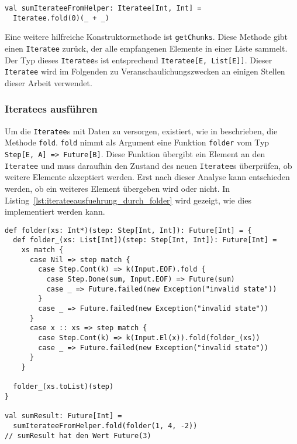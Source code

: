 \begin{lstlisting}[caption=Erstellung eines Iteratees durch Konstruktormethode im Companion-Objekt, label=lst:iteratee_durch_hilfsmethode]
val sumIterateeFromHelper: Iteratee[Int, Int] =
  Iteratee.fold(0)(_ + _)
\end{lstlisting}

Eine weitere hilfreiche Konstruktormethode ist \lstinline|getChunks|.
Diese Methode gibt einen \lstinline|Iteratee| zurück, der alle empfangenen Elemente in einer Liste sammelt.
Der Typ dieses \lstinline|Iteratee|s ist entsprechend \lstinline|Iteratee[E, List[E]]|.
Dieser \lstinline|Iteratee| wird im Folgenden zu Veranschaulichungszwecken an einigen Stellen dieser Arbeit verwendet.



\subsubsection{Iteratees ausführen} %
\label{ssub:iteratees_ausfuehren}

Um die \lstinline|Iteratee|s mit Daten zu versorgen, existiert, wie in  beschrieben, die Methode \lstinline|fold|.
\lstinline|fold| nimmt als Argument eine Funktion \lstinline|folder| vom Typ \lstinline[breaklines=true]|Step[E, A] => Future[B]|.
Diese Funktion übergibt ein Element an den \lstinline|Iteratee| und muss daraufhin den Zustand des neuen \lstinline|Iteratee|s überprüfen, ob weitere Elemente akzeptiert werden.
Erst nach dieser Analyse kann entschieden werden, ob ein weiteres Element übergeben wird oder nicht.
In Listing~\ref{lst:iterateeausfuehrung_durch_folder} wird gezeigt, wie dies implementiert werden kann.

\begin{lstlisting}[caption=Ausführung eines Iteratees durch folder-Funktion, label=lst:iterateeausfuehrung_durch_folder]
def folder(xs: Int*)(step: Step[Int, Int]): Future[Int] = {
  def folder_(xs: List[Int])(step: Step[Int, Int]): Future[Int] =
    xs match {
      case Nil => step match {
        case Step.Cont(k) => k(Input.EOF).fold {
          case Step.Done(sum, Input.EOF) => Future(sum)
          case _ => Future.failed(new Exception("invalid state"))
        }
        case _ => Future.failed(new Exception("invalid state"))
      }
      case x :: xs => step match {
        case Step.Cont(k) => k(Input.El(x)).fold(folder_(xs))
        case _ => Future.failed(new Exception("invalid state"))
      }
    }

  folder_(xs.toList)(step)
}

val sumResult: Future[Int] =
  sumIterateeFromHelper.fold(folder(1, 4, -2))
// sumResult hat den Wert Future(3)
\end{lstlisting}

